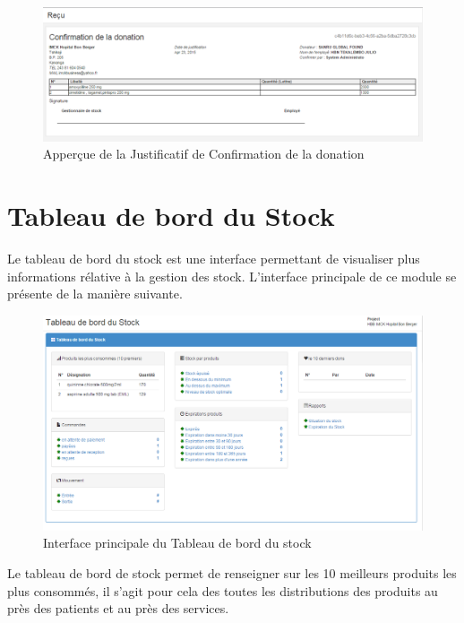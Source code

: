 \documentclass[12pt,a4paper]{report}
\begin{document}
\begin{figure}[h]
\begin{center}
\includegraphics[width=12cm]{pic/PreuveConfDonation.png}
\end{center}
\caption{Apperçue de la Justificatif de Confirmation de la donation}
\label{Apperçue de la Justificatif de Confirmation de la donation}
\end{figure} 


\newpage
\section{Tableau de bord du Stock}
Le tableau de bord du stock est une interface permettant de visualiser plus informations rélative à la gestion des stock. L'interface principale de ce module se présente de la manière suivante.

\begin{figure}[h]
\begin{center}
\includegraphics[width=12cm]{pic/TaBordStock.png}
\end{center}
\caption{Interface principale du Tableau de bord du stock}
\label{Interface principale du Tableau de bord du stock}
\end{figure} 

Le tableau de bord de stock permet de renseigner sur les 10 meilleurs produits les plus consommés, il s'agit pour cela des toutes les distributions des produits au près des patients et au près des services. 
\end{document}
